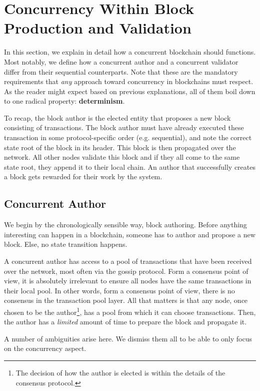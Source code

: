 \section{Concurrency Within Block Production and Validation} \label{chap_approach:sec:concurrency}

In this section, we explain in detail how a concurrent blockchain should functions. Most notably,
we define how a concurrent author and a concurrent validator differ from their sequential
counterparts. Note that these are the mandatory requirements that \textit{any} approach toward
concurrency in blockchains must respect. As the reader might expect based on previous explanations,
all of them boil down to one radical property: \textbf{determinism}.

To recap, the block author is the elected entity that proposes a new block consisting of
transactions. The block author must have already executed these transaction in some
protocol-specific order (e.g. sequential), and note the correct state root of the block in its
header. This block is then propagated over the network. All other nodes validate this block and if
they all come to the same state root, they append it to their local chain. An author that
successfully creates a block gets rewarded for their work by the system.

\subsection{Concurrent Author}

We begin by the chronologically sensible way, block authoring. Before anything interesting can
happen in a blockchain, someone has to author and propose a new block. Else, no state transition
happens.

A concurrent author has access to a pool of transactions that have been received over the network,
most often via the gossip protocol. Form a consensus point of view, it is absolutely irrelevant to
ensure all nodes have the same transactions in their local pool. In other words, form a consensus
point of view, there is no consensus in the transaction pool layer. All that matters is that any
node, once chosen to be the author\footnote{The decision of how the author is elected is within the
details of the consensus protocol.}, has a pool from which it can choose transactions. Then, the
author has a \textit{limited} amount of time to prepare the block and propagate it.

A number of ambiguities arise here. We dismiss them all to be able to only focus on the
concurrency aspect.

